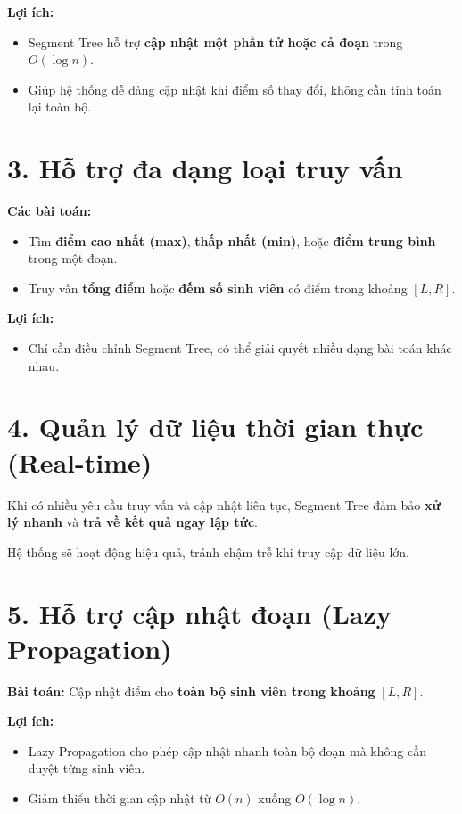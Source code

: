 \documentclass[a4paper]{article}
\begin{document}
\textbf{Lợi ích:}  
\begin{itemize}
    \item Segment Tree hỗ trợ \textbf{cập nhật một phần tử hoặc cả đoạn} trong $O(\log n)$.  
    \item Giúp hệ thống dễ dàng cập nhật khi điểm số thay đổi, không cần tính toán lại toàn bộ.  
\end{itemize}

\section*{3. Hỗ trợ đa dạng loại truy vấn}
\hspace{0.5cm}\textbf{Các bài toán:}  
\begin{itemize}
    \item Tìm \textbf{điểm cao nhất (max)}, \textbf{thấp nhất (min)}, hoặc \textbf{điểm trung bình} trong một đoạn.  
    \item Truy vấn \textbf{tổng điểm} hoặc \textbf{đếm số sinh viên} có điểm trong khoảng $[L, R]$.  
\end{itemize}
\textbf{Lợi ích:}  
\begin{itemize}
    \item Chỉ cần điều chỉnh Segment Tree, có thể giải quyết nhiều dạng bài toán khác nhau.  
\end{itemize}

\section*{4. Quản lý dữ liệu thời gian thực (Real-time)}
\hspace{0.5cm}Khi có nhiều yêu cầu truy vấn và cập nhật liên tục, Segment Tree đảm bảo \textbf{xử lý nhanh} và \textbf{trả về kết quả ngay lập tức}. \medskip

Hệ thống sẽ hoạt động hiệu quả, tránh chậm trễ khi truy cập dữ liệu lớn.

\section*{5. Hỗ trợ cập nhật đoạn (Lazy Propagation)}
\hspace{0.5cm}\textbf{Bài toán:} Cập nhật điểm cho \textbf{toàn bộ sinh viên trong khoảng} $[L, R]$. \medskip

\textbf{Lợi ích:}  
\begin{itemize}
    \item Lazy Propagation cho phép cập nhật nhanh toàn bộ đoạn mà không cần duyệt từng sinh viên.  
    \item Giảm thiểu thời gian cập nhật từ $O(n)$ xuống $O(\log n)$.  
\end{itemize}
\end{document}
